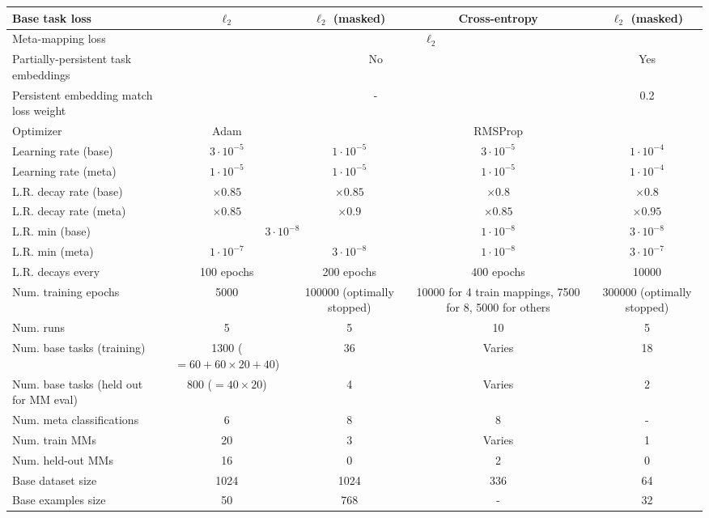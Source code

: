 \begin{table}
\begin{tabular}{|p{3cm}||c|c|c|c|}
Base task loss & $\ell_2$ & $\ell_2$ (masked) & Cross-entropy & $\ell_2$ (masked)\\\hline
Meta-mapping loss & \multicolumn{4}{c|}{$\ell_2$}\\\hline
Partially-persistent task embeddings & \multicolumn{3}{c|}{No} & Yes \\\hline
Persistent embedding match loss weight & \multicolumn{3}{c|}{-} & 0.2 \\\hline
\hline
Optimizer & Adam & \multicolumn{3}{c|}{RMSProp} \\\hline
Learning rate (base) & $3\cdot 10^{-5}$ & $1\cdot 10^{-5}$ & $3\cdot 10^{-5}$ & $1\cdot 10^{-4}$\\\hline
Learning rate (meta) & $1\cdot 10^{-5}$ & $1\cdot 10^{-5}$ & $1\cdot 10^{-5}$ & $1\cdot 10^{-4}$\\\hline
L.R. decay rate (base) & $\times0.85$ & $\times0.85$ & $\times0.8$ & $\times0.8$\\\hline
L.R. decay rate (meta) & $\times0.85$ & $\times0.9$ & $\times0.85$ & $\times0.95$ \\\hline
L.R. min (base) & \multicolumn{2}{c|}{$3 \cdot 10^{-8}$}  & $1 \cdot 10^{-8}$ & $3 \cdot 10^{-8}$\\\hline
L.R. min (meta) & $1 \cdot 10^{-7}$& $3 \cdot 10^{-8}$ &  $1 \cdot 10^{-8}$ & $3 \cdot 10^{-7}$\\\hline
L.R. decays every & 100 epochs & 200 epochs & 400 epochs & 10000 \\\hline
Num. training epochs & 5000 & \multicolumn{1}{p{2.3cm}|}{100000 (optimally stopped)} & \multicolumn{1}{p{2.3cm}|}{10000 for 4 train mappings, 7500 for 8, 5000 for others} & \multicolumn{1}{p{2.3cm}|}{300000 (optimally stopped)} \\\hline
Num. runs & 5 & 5 & 10 & 5 \\ \hline
\hline
Num. base tasks (training) & \multicolumn{1}{p{2.3cm}|}{1300 ( $= 60 + 60 \times  20 + 40$)} & 36 & Varies & 18 \\\hline
Num. base tasks (held out for MM eval) & 800 ($= 40 \times 20$)  & 4 & Varies & 2 \\\hline
Num. meta classifications & 6 & 8 & 8 & - \\\hline
Num. train MMs & 20 & 3 & Varies & 1 \\\hline
Num. held-out MMs & 16 & 0 & 2 & 0  \\\hline
Base dataset size & 1024 & 1024 & 336 & 64 \\\hline
Base examples size & 50 & 768 & - & 32 \\\hline

\end{tabular}
\end{table}
